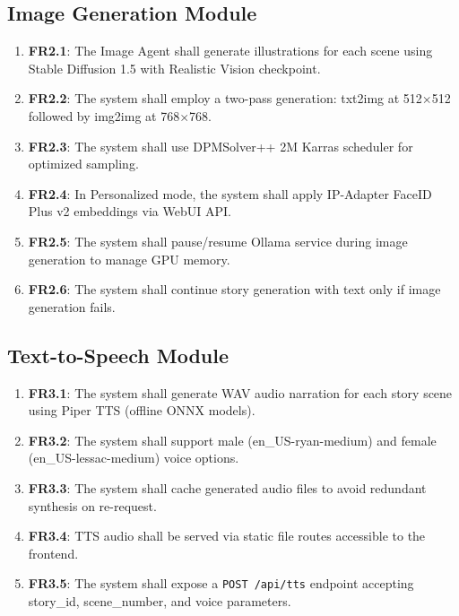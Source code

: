 \subsection{Image Generation Module}
\begin{enumerate}
    \item \textbf{FR2.1}: The Image Agent shall generate illustrations for each scene using Stable Diffusion 1.5 with Realistic Vision checkpoint.
    \item \textbf{FR2.2}: The system shall employ a two-pass generation: txt2img at 512$\times$512 followed by img2img at 768$\times$768.
    \item \textbf{FR2.3}: The system shall use DPMSolver++ 2M Karras scheduler for optimized sampling.
    \item \textbf{FR2.4}: In Personalized mode, the system shall apply IP-Adapter FaceID Plus v2 embeddings via WebUI API.
    \item \textbf{FR2.5}: The system shall pause/resume Ollama service during image generation to manage GPU memory.
    \item \textbf{FR2.6}: The system shall continue story generation with text only if image generation fails.
\end{enumerate}

\subsection{Text-to-Speech Module}
\begin{enumerate}
    \item \textbf{FR3.1}: The system shall generate WAV audio narration for each story scene using Piper TTS (offline ONNX models).
    \item \textbf{FR3.2}: The system shall support male (en\_US-ryan-medium) and female (en\_US-lessac-medium) voice options.
    \item \textbf{FR3.3}: The system shall cache generated audio files to avoid redundant synthesis on re-request.
    \item \textbf{FR3.4}: TTS audio shall be served via static file routes accessible to the frontend.
    \item \textbf{FR3.5}: The system shall expose a \texttt{POST /api/tts} endpoint accepting story\_id, scene\_number, and voice parameters.
\end{enumerate}

